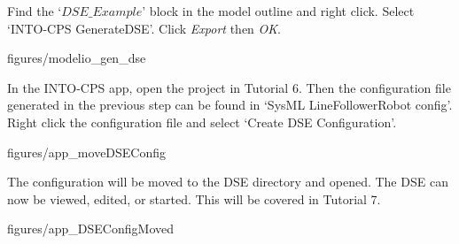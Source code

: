 \documentclass[11pt,a4paper]{../tutorial}
\begin{document}
\begin{instructions}

\item Find the `$DSE\_Example$' block in the model outline and right click. Select `INTO-CPS \menusep GenerateDSE'. Click \emph{Export} then \emph{OK}.

\begin{center}
\begin{annotation}[width=0.7\linewidth]{figures/modelio_gen_dse}
    \end{annotation}
\end{center}


\item In the INTO-CPS app, open the project in Tutorial 6. Then the configuration file generated in the previous step can be found in `SysML \menusep LineFollowerRobot \menusep config'. Right click the configuration file and select `Create DSE Configuration'.

\begin{center}
\begin{annotation}[width=0.7\linewidth]{figures/app_moveDSEConfig}
    \end{annotation}
\end{center}

\newpage

The configuration will be moved to the DSE directory and opened. The DSE can now be viewed, edited, or started. This will be covered in Tutorial 7.

\begin{center}
\begin{annotation}[width=0.7\linewidth]{figures/app_DSEConfigMoved}
    \end{annotation}
\end{center}

\end{instructions}
\end{document}
